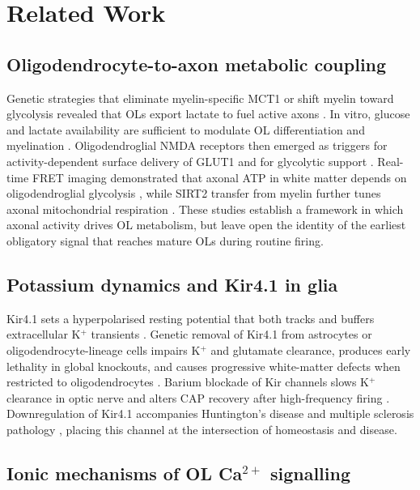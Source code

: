\documentclass[11pt,a4paper]{article}
\begin{document}
\section{Related Work}

\subsection{Oligodendrocyte-to-axon metabolic coupling}

Genetic strategies that eliminate myelin-specific MCT1 or shift myelin toward glycolysis revealed that OLs export lactate to fuel active axons \citep{Funfschilling2012,Lee2012}. In vitro, glucose and lactate availability are sufficient to modulate OL differentiation and myelination \citep{Rinholm2011}. Oligodendroglial NMDA receptors then emerged as triggers for activity-dependent surface delivery of GLUT1 and for glycolytic support \citep{Saab2016}. Real-time FRET imaging demonstrated that axonal ATP in white matter depends on oligodendroglial glycolysis \citep{Trevisiol2017}, while SIRT2 transfer from myelin further tunes axonal mitochondrial respiration \citep{Chamberlain2021}. These studies establish a framework in which axonal activity drives OL metabolism, but leave open the identity of the earliest obligatory signal that reaches mature OLs during routine firing.

\subsection{Potassium dynamics and Kir4.1 in glia}

Kir4.1 sets a hyperpolarised resting potential that both tracks and buffers extracellular K$^+$ transients \citep{Kofuji2000,Olsen2015,Hawkins2017}. Genetic removal of Kir4.1 from astrocytes or oligodendrocyte-lineage cells impairs K$^+$ and glutamate clearance, produces early lethality in global knockouts, and causes progressive white-matter defects when restricted to oligodendrocytes \citep{Djukic2007,Neusch2001,Larson2018,Schirmer2018}. Barium blockade of Kir channels slows K$^+$ clearance in optic nerve and alters CAP recovery after high-frequency firing \citep{Bay2012,Larson2018}. Downregulation of Kir4.1 accompanies Huntington's disease and multiple sclerosis pathology \citep{Tong2014,Schirmer2018,Stumpf2019}, placing this channel at the intersection of homeostasis and disease.

\subsection{Ionic mechanisms of OL Ca$^{2+}$ signalling}
\end{document}
